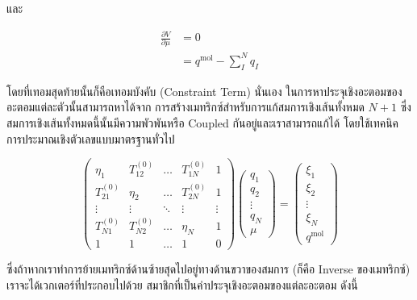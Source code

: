 \noindent และ

\begin{align}
  \frac{\partial V}{\partial \mu}
  &=
  0 \\
  &=
  q^{\mathrm{mol}}-\sum_I^N q_I
\end{align}

\noindent โดยที่เทอมสุดท้ายนั้นก็คือเทอมบังคับ (Constraint Term) นั่นเอง ในการหาประจุเชิงอะตอมของอะตอมแต่ละตัวนั้นสามารถหาได้จาก%
การสร้างเมทริกซ์สำหรับการแก้สมการเชิงเส้นทั้งหมด $N+1$ ซึ่งสมการเชิงเส้นทั้งหมดนี้นั้นมีความพัวพันหรือ Coupled กันอยู่และเราสามารถแก้ได้%
โดยใช้เทคนิคการประมาณเชิงตัวเลขแบบมาตรฐานทั่วไป

\begin{equation}
  \left(\begin{array}{ccccc}
    \eta_1        & T_{12}^{(0)}  & \ldots & T_{1 N}^{(0)} & 1      \\
    T_{21}^{(0)}  & \eta_2        & \ldots & T_{2 N}^{(0)} & 1      \\
    \vdots        & \vdots        & \ddots & \vdots        & \vdots \\
    T_{N 1}^{(0)} & T_{N 2}^{(0)} & \ldots & \eta_N        & 1      \\
    1             & 1             & \ldots & 1             & 0
  \end{array}\right)\left(\begin{array}{c}
    q_1    \\
    q_2    \\
    \vdots \\
    q_N    \\
    \mu
  \end{array}\right)
  =
  \left(\begin{array}{c}
    \xi_1  \\
    \xi_2  \\
    \vdots \\
    \xi_N  \\
    q^{\mathrm{mol}}
  \end{array}\right)
\end{equation}

\noindent ซึ่งถ้าหากเราทำการย้ายเมทริกซ์ด้านซ้ายสุดไปอยู่ทางด้านขวาของสมการ (ก็คือ Inverse ของเมทริกซ์) เราจะได้เวกเตอร์ที่ประกอบไปด้วย%
สมาชิกที่เป็นค่าประจุเชิงอะตอมของแต่ละอะตอม ดังนี้

